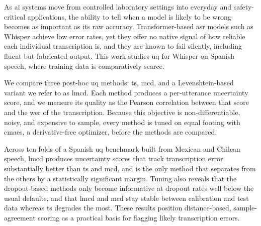 
As \acrfull{ai} systems move from controlled laboratory settings into everyday and safety-critical applications, the ability to tell when a model is likely to be wrong becomes as important as its raw accuracy. Transformer-based \acrfull{asr} models such as Whisper achieve low error rates, yet they offer no native signal of how reliable each individual transcription is, and they are known to fail silently, including fluent but fabricated output. This work studies \acrfull{uq} for Whisper on Spanish speech, where training data is comparatively scarce.

We compare three post-hoc \acrshort{uq} methods: \acrfull{ts}, \acrfull{mcd}, and a Levenshtein-based variant we refer to as \acrfull{lmcd}. Each method produces a per-utterance uncertainty score, and we measure its quality as the Pearson correlation between that score and the \acrfull{wer} of the transcription. Because this objective is non-differentiable, noisy, and expensive to sample, every method is tuned on equal footing with \acrfull{cmaes}, a derivative-free optimizer, before the methods are compared.

Across ten folds of a Spanish \acrshort{uq} benchmark built from Mexican and Chilean speech, \acrshort{lmcd} produces uncertainty scores that track transcription error substantially better than \acrshort{ts} and \acrshort{mcd}, and is the only method that separates from the others by a statistically significant margin. Tuning also reveals that the dropout-based methods only become informative at dropout rates well below the usual defaults, and that \acrshort{lmcd} and \acrshort{mcd} stay stable between calibration and test data whereas \acrshort{ts} degrades the most. These results position distance-based, sample-agreement scoring as a practical basis for flagging likely transcription errors.

